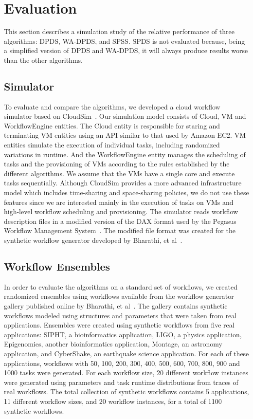 \documentclass[conference]{IEEEtran}
\begin{document}
\section{Evaluation}
\label{sec:performance}

This section describes a simulation study of the relative performance of three algorithms: DPDS, WA-DPDS, and SPSS. SPDS is not evaluated because, being a simplified version of DPDS and WA-DPDS, it will always produce results worse than the other algorithms.


\subsection{Simulator}

To evaluate and compare the algorithms, we developed a cloud workflow simulator based on CloudSim~\cite{Calheiros2011}. Our simulation model consists of Cloud, VM and WorkflowEngine entities. The Cloud entity is responsible for staring and terminating VM entities using an API similar to that used by Amazon EC2. VM entities simulate the execution of individual tasks, including randomized variations in runtime. And the WorkflowEngine entity manages the scheduling of tasks and the provisioning of VMs according to the rules established by the different algorithms. We assume that the VMs have a single core and execute tasks sequentially. Although CloudSim provides a more advanced infrastructure model which includes time-sharing and space-sharing policies, we do not use these features since we are interested mainly in the execution of tasks on VMs and high-level workflow scheduling and provisioning. The simulator reads workflow description files in a modified version of the DAX format used by the Pegasus Workflow Management System~\cite{Deelman2005}. The modified file format was created for the synthetic workflow generator developed by Bharathi, et al~\cite{Bharathi2008}.


\subsection{Workflow Ensembles}
\label{sec:ensembles}

In order to evaluate the algorithms on a standard set of workflows, we created randomized ensembles using workflows available from the workflow generator gallery published online by Bharathi, et al~\cite{WorkflowGenerator}. The gallery contains synthetic workflows modeled using structures and parameters that were taken from real applications. Ensembles were created using synthetic workflows from five real applications: SIPHT, a bioinformatics application, LIGO, a physics application, Epigenomics, another bioinformatics application, Montage, an astronomy application, and CyberShake, an earthquake science application. For each of these applications, workflows with 50, 100, 200, 300, 400, 500, 600, 700, 800, 900 and 1000 tasks were generated. For each workflow size, 20 different workflow instances were generated using parameters and task runtime distributions from traces of real workflows. The total collection of synthetic workflows contains 5 applications, 11 different workflow sizes, and 20 workflow instances, for a total of 1100 synthetic workflows.
\end{document}

